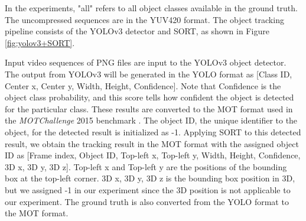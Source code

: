 
In the experiments, "all" refers to all object classes available in the ground truth. The uncompressed sequences are in the YUV420 format. The object tracking pipeline consists of the YOLOv3 detector and SORT, as shown in Figure \ref{fig:yolov3+SORT}. 

Input video sequences of PNG files are input to the YOLOv3 object detector. The output from YOLOv3 will be generated in the YOLO format as [Class ID, Center x, Center y, Width, Height, Confidence]. Note that Confidence is the object class probability, and this score tells how confident the object is detected for the particular class. These results are converted to the MOT format used in the \textit{MOTChallenge} 2015 benchmark \cite{leal-taixe_motchallenge_2015}. The object ID, the unique identifier to the object, for the detected result is initialized as -1. Applying SORT to this detected result, we obtain the tracking result in the MOT format with the assigned object ID as [Frame index, Object ID, Top-left x, Top-left y, Width, Height, Confidence, 3D x, 3D y, 3D z]. Top-left x and Top-left y are the positions of the bounding box at the top-left corner. 3D x, 3D y, 3D z is the bounding box position in 3D, but we assigned -1 in our experiment since the 3D position is not applicable to our experiment. The ground truth is also converted from the YOLO format to the MOT format.





